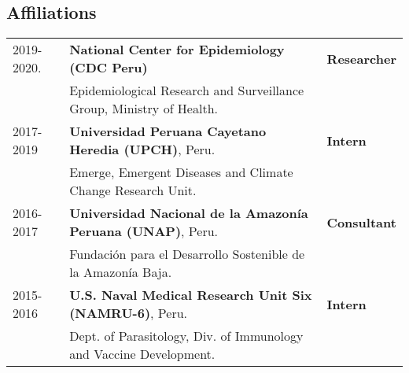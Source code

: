 \documentclass[margin,line]{res}
\begin{document}
\begin{resume}


\section{\sc Affiliations}

\begin{tabular}{ l l l }
	2019-2020. & \textbf{National Center for Epidemiology (CDC Peru)}&{\bf Researcher}\\
	& Epidemiological Research and Surveillance Group, Ministry of Health.&\\
	2017-2019 & \textbf{Universidad Peruana Cayetano Heredia (UPCH)}, Peru.&{\bf Intern}\\
	& Emerge, Emergent Diseases and Climate Change Research Unit.&\\
	2016-2017 & \textbf{Universidad Nacional de la Amazon\'ia Peruana (UNAP)}, Peru.&{\bf Consultant}\\
	& Fundaci\'on para el Desarrollo Sostenible de la Amazon\'ia Baja.&\\
	2015-2016 & \textbf{U.S. Naval Medical Research Unit Six (NAMRU-6)}, Peru.&{\bf Intern}\\
	& Dept. of Parasitology, Div. of Immunology and Vaccine Development.&\\
\end{tabular}%


\end{resume}
\end{document}

